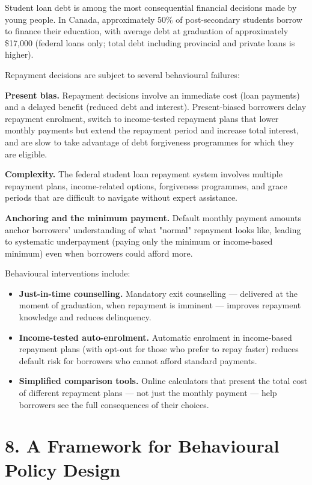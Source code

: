 \documentclass[12pt, letterpaper]{article}
\begin{document}
Student loan debt is among the most consequential financial decisions made by young people. In Canada, approximately 50\% of post-secondary students borrow to finance their education, with average debt at graduation of approximately \$17,000 (federal loans only; total debt including provincial and private loans is higher).

Repayment decisions are subject to several behavioural failures:

\textbf{Present bias.} Repayment decisions involve an immediate cost (loan payments) and a delayed benefit (reduced debt and interest). Present-biased borrowers delay repayment enrolment, switch to income-tested repayment plans that lower monthly payments but extend the repayment period and increase total interest, and are slow to take advantage of debt forgiveness programmes for which they are eligible.

\textbf{Complexity.} The federal student loan repayment system involves multiple repayment plans, income-related options, forgiveness programmes, and grace periods that are difficult to navigate without expert assistance.

\textbf{Anchoring and the minimum payment.} Default monthly payment amounts anchor borrowers' understanding of what "normal" repayment looks like, leading to systematic underpayment (paying only the minimum or income-based minimum) even when borrowers could afford more.

Behavioural interventions include:
\begin{itemize}
\item \textbf{Just-in-time counselling.} Mandatory exit counselling --- delivered at the moment of graduation, when repayment is imminent --- improves repayment knowledge and reduces delinquency.
\item \textbf{Income-tested auto-enrolment.} Automatic enrolment in income-based repayment plans (with opt-out for those who prefer to repay faster) reduces default risk for borrowers who cannot afford standard payments.
\item \textbf{Simplified comparison tools.} Online calculators that present the total cost of different repayment plans --- not just the monthly payment --- help borrowers see the full consequences of their choices.
\end{itemize}

\medskip


\section{8. A Framework for Behavioural Policy Design}
\end{document}
